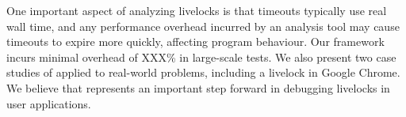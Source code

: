 One important aspect of analyzing livelocks is that timeouts typically use real wall time,
and any performance overhead incurred by an analysis tool may cause timeouts to expire more quickly,
affecting program behaviour. Our framework incurs minimal overhead of XXX\% in large-scale tests.
We also present two case studies of \sys applied to real-world problems, including a livelock in Google Chrome.
We believe that \sys represents an important step forward in debugging livelocks in user applications.
